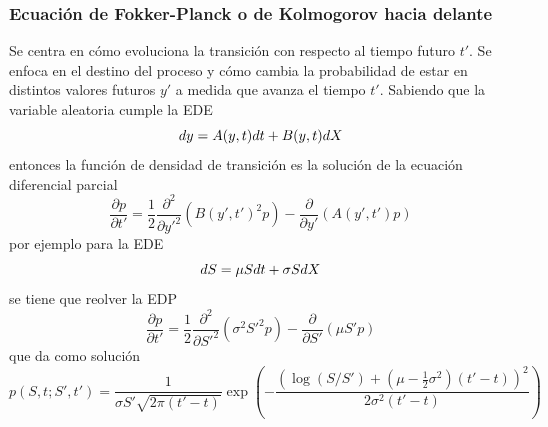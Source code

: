 \subsubsection{Ecuación de Fokker-Planck o de Kolmogorov hacia delante}
Se centra en cómo evoluciona la transición con respecto al tiempo futuro $t'$. Se enfoca en el destino del proceso y cómo cambia la probabilidad de estar en distintos valores futuros $y'$ a medida que avanza el tiempo $t'$. Sabiendo que la variable aleatoria cumple la EDE
\[
    dy = A(y, t) dt + B(y, t) d\mathnormal{X}
\]
entonces la función de densidad de transición es la solución de la ecuación diferencial parcial
\[
    \boxed{\frac{\partial p}{\partial t'} = \frac{1}{2} \frac{\partial^2}{\partial y'^2} \left( B(y', t')^2 p \right) - \frac{\partial}{\partial y'} \left( A(y', t') p \right)}
\]
por ejemplo para la EDE
\[
    dS = \mu S dt + \sigma S d\mathnormal{X}
\]
se tiene que reolver la EDP
\[
    \frac{\partial p}{\partial t'} = \frac{1}{2} \frac{\partial^2}{\partial S'^2} \left( \sigma^2 S'^2 p \right) - \frac{\partial}{\partial S'} \left( \mu S' p \right)
\]
que da como solución
\[
    p(S, t; S', t') = \frac{1}{\sigma S' \sqrt{2\pi (t'-t)}} \exp\left( -\frac{ \left( \log(S/S') + (\mu - \frac{1}{2}\sigma^2)(t'-t) \right)^2 }{ 2\sigma^2 (t'-t) } \right)
\]
